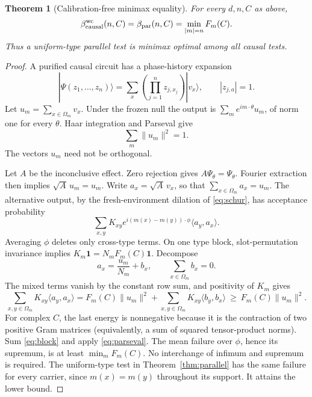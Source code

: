 \documentclass[11pt,a4paper]{article}
\newtheorem{theorem}{Theorem}[section]
\theoremstyle{remark}
\newcommand{\ket}[1]{|#1\rangle}
\newcommand{\ip}[2]{\langle #1,#2\rangle}
\begin{document}
\begin{theorem}[Calibration-free minimax equality]\label{thm:minimax}
For every \(d,n,C\) as above,
\begin{equation}\label{eq:minimax}
 \beta_{\rm causal}^{\rm wc}(n,C)
 =\beta_{\rm par}(n,C)=\min_{|m|=n}F_m(C).
\end{equation}
Thus a uniform-type parallel test is minimax optimal among all causal tests.
\end{theorem}
\begin{proof}
A purified causal circuit has a phase-history expansion
\begin{equation}\label{eq:history}
 \ket{\Psi(z_1,\ldots,z_n)}
   =\sum_x\left(\prod_{j=1}^n z_{j,x_j}\right)\ket{v_x},
 \qquad |z_{j,a}|=1.
\end{equation}
Let \(u_m=\sum_{x\in\Omega_m}v_x\). Under the frozen null the output is
\(\sum_m e^{im\cdot\theta}u_m\), of norm one for every \(\theta\).
Haar integration and Parseval give
\begin{equation}\label{eq:parseval}
 \sum_m\|u_m\|^2=1.
\end{equation}
The vectors \(u_m\) need not be orthogonal.

Let \(A\) be the inconclusive effect. Zero rejection gives
\(A\Psi_\theta=\Psi_\theta\). Fourier extraction then implies
\(\sqrt A\,u_m=u_m\). Write \(a_x=\sqrt A\,v_x\), so that
\(\sum_{x\in\Omega_m}a_x=u_m\).
The alternative output, by the fresh-environment dilation of
\eqref{eq:schur}, has acceptance probability
\[
 \sum_{x,y}K_{xy}
 e^{i(m(x)-m(y))\cdot\phi}\ip{a_y}{a_x}.
\]
Averaging \(\phi\) deletes only cross-type terms. On one type block,
slot-permutation invariance implies
\(K_m\mathbf1=N_mF_m(C)\mathbf1\).
Decompose
\[
 a_x=\frac{u_m}{N_m}+b_x,\qquad
 \sum_{x\in\Omega_m}b_x=0.
\]
The mixed terms vanish by the constant row sum, and positivity of \(K_m\)
gives
\begin{equation}\label{eq:block}
 \sum_{x,y\in\Omega_m}K_{xy}\ip{a_y}{a_x}
 =F_m(C)\|u_m\|^2+
   \sum_{x,y\in\Omega_m}K_{xy}\ip{b_y}{b_x}
 \ \geq\ F_m(C)\|u_m\|^2.
\end{equation}
For complex \(C\), the last energy is nonnegative because it is the
contraction of two positive Gram matrices (equivalently, a sum of squared
tensor-product norms).
Sum \eqref{eq:block} and apply \eqref{eq:parseval}. The mean failure over
\(\phi\), hence its supremum, is at least \(\min_m F_m(C)\).
No interchange of infimum and supremum is required.
The uniform-type test in Theorem~\ref{thm:parallel} has the same failure
for every carrier, since \(m(x)=m(y)\) throughout its support.
It attains the lower bound.
\end{proof}
\end{document}
